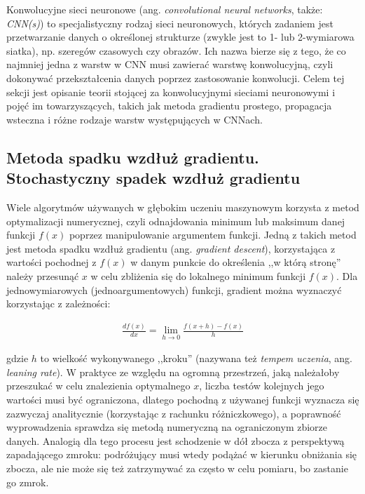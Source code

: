 \documentclass[12pt,a4paper,leqno,oneside,titlepage]{book}
\begin{document}
Konwolucyjne sieci neuronowe (ang. \textit{convolutional neural networks}, także: \textit{CNN(s)}) to specjalistyczny rodzaj sieci neuronowych, których zadaniem jest przetwarzanie danych o określonej strukturze (zwykle jest to 1- lub 2-wymiarowa siatka), np. szeregów czasowych czy obrazów. Ich nazwa bierze się z tego, że co najmniej jedna z warstw w CNN musi zawierać warstwę konwolucyjną, czyli dokonywać przekształcenia danych poprzez zastosowanie konwolucji.\cite{Goodfellow-et-al-2016} Celem tej sekcji jest opisanie teorii stojącej za konwolucyjnymi sieciami neuronowymi i pojęć im towarzyszących, takich jak metoda gradientu prostego, propagacja wsteczna i różne rodzaje warstw występujących w CNNach.

\subsection{Metoda spadku wzdłuż gradientu. Stochastyczny spadek wzdłuż gradientu}

Wiele algorytmów używanych w głębokim uczeniu maszynowym korzysta z metod optymalizacji numerycznej, czyli odnajdowania minimum lub maksimum danej funkcji $f(x)$ poprzez manipulowanie argumentem funkcji. Jedną z takich metod jest metoda spadku wzdłuż gradientu (ang. \textit{gradient descent}), korzystająca z wartości pochodnej z $f(x)$ w danym punkcie do określenia ,,w którą stronę'' należy przesunąć $x$ w celu zbliżenia się do lokalnego minimum funkcji $f(x)$. Dla jednowymiarowych (jednoargumentowych) funkcji, gradient można wyznaczyć korzystając z zależności:

\begin{align}
\frac{df(x)}{dx} = \left.
	\lim_{h \to 0} \frac{f(x+h)-f(x)}{h}
	\right.
\end{align}

gdzie $h$ to wielkość wykonywanego ,,kroku'' (nazywana też \textit{tempem uczenia}, ang. \textit{leaning rate}). W praktyce ze względu na ogromną przestrzeń, jaką należałoby przeszukać w celu znalezienia optymalnego $x$, liczba testów kolejnych jego wartości musi być ograniczona, dlatego pochodną z używanej funkcji wyznacza się zazwyczaj analitycznie (korzystając z rachunku różniczkowego), a poprawność wyprowadzenia sprawdza się metodą numeryczną na ograniczonym zbiorze danych. Analogią dla tego procesu jest schodzenie w dół zbocza z perspektywą zapadającego zmroku: podróżujący musi wtedy podążać w kierunku obniżania się zbocza, ale nie może się też zatrzymywać za często w celu pomiaru, bo zastanie go zmrok. \cite{StanfordCNN}
\end{document}
